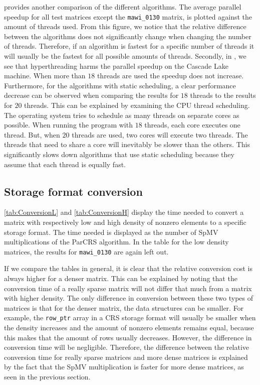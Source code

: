 \documentclass{siamart220329}
\begin{document}
 provides another comparison of the different algorithms. The average parallel speedup for all test matrices except the \texttt{mawi\_0130} matrix, is plotted against the amount of threads used. From this figure, we notice that the relative difference between the algorithms does not significantly change when changing the number of threads. Therefore, if an algorithm is fastest for a specific number of threads it will usually be the fastest for all possible amounts of threads. Secondly, in , we see that hyperthreading harms the parallel speedup on the Cascade Lake machine. When more than $18$ threads are used the speedup does not increase. Furthermore, for the algorithms with static scheduling, a clear performance decrease can be observed when comparing the results for $18$ threads to the results for $20$ threads. This can be explained by examining the CPU thread scheduling. The operating system tries to schedule as many threads on separate cores as possible. When running the program with $18$ threads, each core executes one thread. But, when $20$ threads are used, two cores will execute two threads. The threads that need to share a core will inevitably be slower than the others. This significantly slows down algorithms that use static scheduling because they assume that each thread is equally fast.


\subsection{Storage format conversion}

\cref{tab:ConversionL} and \cref{tab:ConversionH} display the time needed to convert a matrix with respectively low and high density of nonzero elements to a specific storage format. The time needed is displayed as the number of SpMV multiplications of the ParCRS algorithm. In the table for the low density matrices, the results for \texttt{mawi\_0130} are again left out.




If we compare the tables in general, it is clear that the relative conversion cost is always higher for a denser matrix. This can be explained by noting that the conversion time of a really sparse matrix will not differ that much from a matrix with higher density. The only difference in conversion between these two types of matrices is that for the denser matrix, the data structures can be smaller. For example, the \texttt{row\_ptr} array in a CRS storage format will usually be smaller when the density increases and the amount of nonzero elements remains equal, because this makes that the amount of rows usually decreases. However, the difference in conversion time will be negligible. Therefore, the difference between the relative conversion time for really sparse matrices and more dense matrices is explained by the fact that the SpMV multiplication is faster for more dense matrices, as seen in the previous section.
\end{document}
